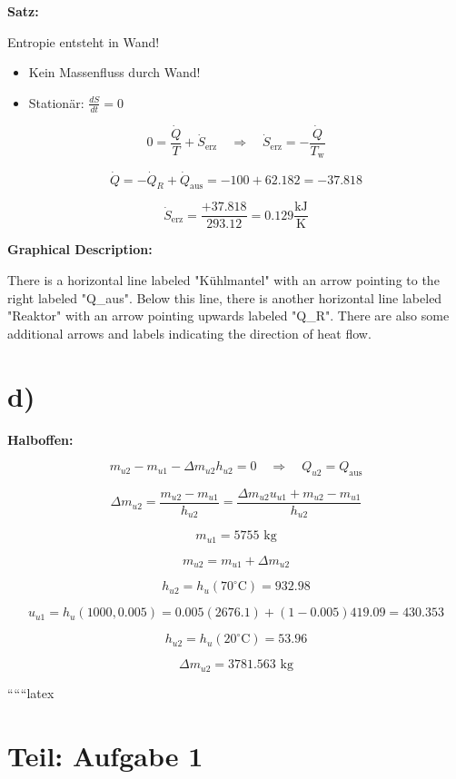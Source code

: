 \textbf{Satz:}

Entropie entsteht in Wand!

\begin{itemize}
    \item Kein Massenfluss durch Wand!
    \item Stationär: $\frac{dS}{dt} = 0$
\end{itemize}

\[
0 = \frac{\dot{Q}}{T} + \dot{S}_{\text{erz}} \quad \Rightarrow \quad \dot{S}_{\text{erz}} = -\frac{\dot{Q}}{T_{\text{w}}}
\]

\[
\dot{Q} = -\dot{Q}_{R} + \dot{Q}_{\text{aus}} = -100 + 62.182 = -37.818
\]

\[
\dot{S}_{\text{erz}} = \frac{+37.818}{293.12} = 0.129 \frac{\text{kJ}}{\text{K}}
\]

\textbf{Graphical Description:}

There is a horizontal line labeled "Kühlmantel" with an arrow pointing to the right labeled "Q_{aus}". Below this line, there is another horizontal line labeled "Reaktor" with an arrow pointing upwards labeled "Q_{R}". There are also some additional arrows and labels indicating the direction of heat flow.

\section*{d)}

\textbf{Halboffen:}

\[
m_{u2} - m_{u1} - \Delta m_{u2} h_{u2} = 0 \quad \Rightarrow \quad Q_{u2} = Q_{\text{aus}}
\]

\[
\Delta m_{u2} = \frac{m_{u2} - m_{u1}}{h_{u2}} = \frac{\Delta m_{u2} u_{u1} + m_{u2} - m_{u1}}{h_{u2}}
\]

\[
m_{u1} = 5755 \text{ kg}
\]

\[
m_{u2} = m_{u1} + \Delta m_{u2}
\]

\[
h_{u2} = h_{u}(70^\circ \text{C}) = 932.98
\]

\[
u_{u1} = h_{u}(1000, 0.005) = 0.005 (2676.1) + (1 - 0.005) 419.09 = 430.353
\]

\[
h_{u2} = h_{u}(20^\circ \text{C}) = 53.96
\]

\[
\Delta m_{u2} = 3781.563 \text{ kg}
\]

``````latex


\section*{Teil: Aufgabe 1}

